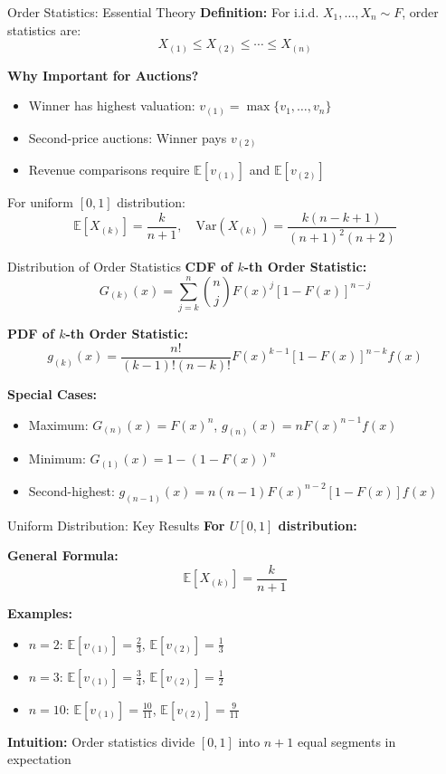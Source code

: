 \documentclass[xcolor={x11names}, aspectratio=169 ]{beamer}
\newcommand{\E}{\mathbb{E}}
\begin{document}
\begin{frame}{Order Statistics: Essential Theory}
\textbf{Definition:} For i.i.d. $X_1, \ldots, X_n \sim F$, order statistics are:
\[X_{(1)} \leq X_{(2)} \leq \cdots \leq X_{(n)}\]

\textbf{Why Important for Auctions?}
\begin{itemize}
  \item Winner has highest valuation: $v_{(1)} = \max\{v_1, \ldots, v_n\}$
  \item Second-price auctions: Winner pays $v_{(2)}$
  \item Revenue comparisons require $\mathbb{E}[v_{(1)}]$ and $\mathbb{E}[v_{(2)}]$
\end{itemize}

\begin{tcolorbox}[colback=blue!5!white,colframe=blue!75!black,title=Key Result]
For uniform $[0,1]$ distribution:
\[\E[X_{(k)}] = \frac{k}{n+1}, \quad \text{Var}(X_{(k)}) = \frac{k(n-k+1)}{(n+1)^2(n+2)}\]
\end{tcolorbox}
\end{frame}

\begin{frame}{Distribution of Order Statistics}
\textbf{CDF of $k$-th Order Statistic:}
\[G_{(k)}(x) = \sum_{j=k}^n \binom{n}{j} F(x)^j [1-F(x)]^{n-j}\]

\textbf{PDF of $k$-th Order Statistic:}
\[g_{(k)}(x) = \frac{n!}{(k-1)!(n-k)!} F(x)^{k-1}[1-F(x)]^{n-k}f(x)\]

\textbf{Special Cases:}
\begin{itemize}
  \item Maximum: $G_{(n)}(x) = F(x)^n$, $g_{(n)}(x) = nF(x)^{n-1}f(x)$
  \item Minimum: $G_{(1)}(x) = 1-(1-F(x))^n$
  \item Second-highest: $g_{(n-1)}(x) = n(n-1)F(x)^{n-2}[1-F(x)]f(x)$
\end{itemize}
\end{frame}

\begin{frame}{Uniform Distribution: Key Results}
\textbf{For $U[0,1]$ distribution:}

\textbf{General Formula:}
\[\mathbb{E}[X_{(k)}] = \frac{k}{n+1}\]

\textbf{Examples:}
\begin{itemize}
  \item $n=2$: $\mathbb{E}[v_{(1)}] = \frac{2}{3}$, $\mathbb{E}[v_{(2)}] = \frac{1}{3}$
  \item $n=3$: $\mathbb{E}[v_{(1)}] = \frac{3}{4}$, $\mathbb{E}[v_{(2)}] = \frac{1}{2}$
  \item $n=10$: $\mathbb{E}[v_{(1)}] = \frac{10}{11}$, $\mathbb{E}[v_{(2)}] = \frac{9}{11}$
\end{itemize}

\textbf{Intuition:} Order statistics divide $[0,1]$ into $n+1$ equal segments in expectation
\end{frame}
\end{document}
